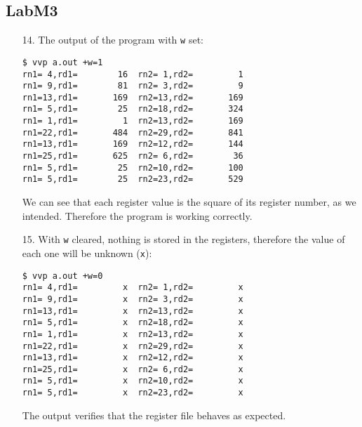 \documentclass{article}
\begin{document}
\subsection{LabM3}
\begin{enumerate}
\item[14. ] The output of the program with \verb$w$ set:
\begin{verbatim}
$ vvp a.out +w=1
rn1= 4,rd1=        16  rn2= 1,rd2=         1
rn1= 9,rd1=        81  rn2= 3,rd2=         9
rn1=13,rd1=       169  rn2=13,rd2=       169
rn1= 5,rd1=        25  rn2=18,rd2=       324
rn1= 1,rd1=         1  rn2=13,rd2=       169
rn1=22,rd1=       484  rn2=29,rd2=       841
rn1=13,rd1=       169  rn2=12,rd2=       144
rn1=25,rd1=       625  rn2= 6,rd2=        36
rn1= 5,rd1=        25  rn2=10,rd2=       100
rn1= 5,rd1=        25  rn2=23,rd2=       529
\end{verbatim}
  We can see that each register value is the square of its register
number, as we intended. Therefore the program is working correctly.

\item[15. ] With \verb$w$ cleared, nothing is stored in the registers,
therefore the value of each one will be unknown (\verb$x$):
\begin{verbatim}
$ vvp a.out +w=0
rn1= 4,rd1=         x  rn2= 1,rd2=         x
rn1= 9,rd1=         x  rn2= 3,rd2=         x
rn1=13,rd1=         x  rn2=13,rd2=         x
rn1= 5,rd1=         x  rn2=18,rd2=         x
rn1= 1,rd1=         x  rn2=13,rd2=         x
rn1=22,rd1=         x  rn2=29,rd2=         x
rn1=13,rd1=         x  rn2=12,rd2=         x
rn1=25,rd1=         x  rn2= 6,rd2=         x
rn1= 5,rd1=         x  rn2=10,rd2=         x
rn1= 5,rd1=         x  rn2=23,rd2=         x
\end{verbatim}
The output verifies that the register file behaves as expected.
\end{enumerate}
\end{document}

